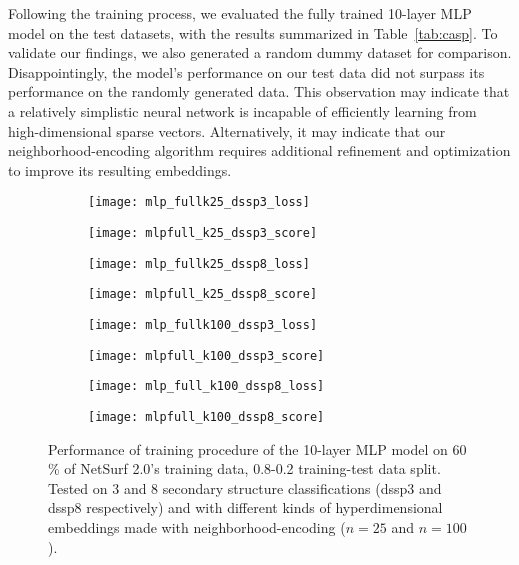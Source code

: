 Following the training process, we evaluated the fully trained 10-layer MLP model on the test datasets, with the results summarized in Table~\ref{tab:casp}. To validate our findings, we also generated a random dummy dataset for comparison. Disappointingly, the model's performance on our test data did not surpass its performance on the randomly generated data. This observation may indicate that a relatively simplistic neural network is incapable of efficiently learning from high-dimensional sparse vectors. Alternatively, it may indicate that our neighborhood-encoding algorithm requires additional refinement and optimization to improve its resulting embeddings.

\begin{figure}[htbp]
    \centering
    \begin{subfigure}{0.48\textwidth}
        \texttt{[image: mlp\_fullk25\_dssp3\_loss]}
        \label{fig:subefig}
    \end{subfigure}
    \hfill
    \begin{subfigure}{0.48\textwidth}
        \texttt{[image: mlpfull\_k25\_dssp3\_score]}
        \label{fig:subefi}
    \end{subfigure}
    
    \begin{subfigure}{0.48\textwidth}
        \texttt{[image: mlp\_fullk25\_dssp8\_loss]}
        \label{fig:subef}
    \end{subfigure}
    \hfill
    \begin{subfigure}{0.48\textwidth}
        \texttt{[image: mlpfull\_k25\_dssp8\_score]}
        \label{fig:sube}
    \end{subfigure}
    
    \begin{subfigure}{0.48\textwidth}
        \texttt{[image: mlp\_fullk100\_dssp3\_loss]}
        \label{fig:sue}
    \end{subfigure}
    \hfill
    \begin{subfigure}{0.48\textwidth}
        \texttt{[image: mlpfull\_k100\_dssp3\_score]}
        \label{fig:se}
    \end{subfigure}
    
    \begin{subfigure}{0.48\textwidth}
        \texttt{[image: mlp\_full\_k100\_dssp8\_loss]}
        \label{fig:sge}
    \end{subfigure}
    \hfill
    \begin{subfigure}{0.48\textwidth}
        \texttt{[image: mlpfull\_k100\_dssp8\_score]}
        \label{fig:she}
    \end{subfigure}
    \caption{Performance of training procedure of the 10-layer MLP model on 60 \% of NetSurf 2.0's training data, 0.8-0.2 training-test data split. Tested on 3 and 8 secondary structure classifications (dssp3 and dssp8 respectively) and with different kinds of hyperdimensional embeddings made with neighborhood-encoding ($n = 25$ and $n=100$).}
    \label{fig:main8e}
  \end{figure}